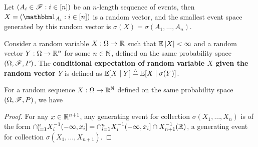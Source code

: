 \documentclass[letterpaper,10pt,english]{article}
\begin{document}
\begin{rem}
Let $(A_i \in \mathscr{F}:  i \in [n])$ be an $n$-length sequence of events, 
then $X = (\Ind{A_i}: i \in [n])$ is a random vector, and the smallest event space generated by this random vector is $\sigma(X) = \sigma(A_1, \dots, A_n)$. 
\end{rem}
\begin{defn}%
Consider a random variable $X:\Omega \to\mathbb{R}$ such that $\mathbb{E}\left\lvert X\right\rvert < \infty$ and a random vector $Y:\Omega \to \mathbb{R}^n$ for some $n\in \mathbb{N}$, 
defined on the same probability space $(\Omega, \mathscr{F}, P)$. 
The \textbf{conditional expectation of random variable $X$ given the random vector $Y$} is defined as $\mathbb{E}[X\mid Y] \triangleq \mathbb{E}[X\mid\sigma(Y)]$. 
\end{defn}
\begin{lem} 
For a random sequence $X: \Omega \to \mathbb{R}^{\mathbb{N}}$ defined on the same probability space $(\Omega, \mathscr{F}, P)$, 
we have 
\end{lem}
\begin{proof}
For any $x \in \mathbb{R}^{n+1}$, 
any generating event for collection $\sigma(X_1, \dots, X_n)$ is of the form $\cap_{i=1}^nX_i^{-1}(-\infty, x_i] = \cap_{i=1}^nX_i^{-1}(-\infty, x_i]\cap X_{n+1}^{-1}(\mathbb{R})$, a generating event for collection $\sigma(X_1, \dots, X_{n+1})$.  
\end{proof}
\end{document}

